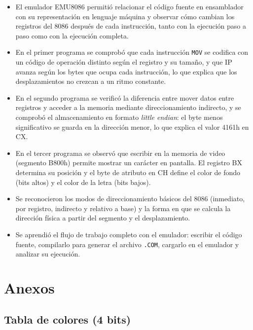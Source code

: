 \documentclass[10pt]{article}
\begin{document}
\begin{itemize}
  \item El emulador EMU8086 permitió relacionar el código fuente en ensamblador con su representación en lenguaje máquina y observar cómo cambian los registros del 8086 después de cada instrucción, tanto con la ejecución paso a paso como con la ejecución completa.
  \item En el primer programa se comprobó que cada instrucción \texttt{MOV} se codifica con un código de operación distinto según el registro y su tamaño, y que IP avanza según los bytes que ocupa cada instrucción, lo que explica que los desplazamientos no crezcan a un ritmo constante.
  \item En el segundo programa se verificó la diferencia entre mover datos entre registros y acceder a la memoria mediante direccionamiento indirecto, y se comprobó el almacenamiento en formato \textit{little endian}: el byte menos significativo se guarda en la dirección menor, lo que explica el valor 4161h en CX.
  \item En el tercer programa se observó que escribir en la memoria de video (segmento B800h) permite mostrar un carácter en pantalla. El registro BX determina su posición y el byte de atributo en CH define el color de fondo (bits altos) y el color de la letra (bits bajos).
  \item Se reconocieron los modos de direccionamiento básicos del 8086 (inmediato, por registro, indirecto y relativo a base) y la forma en que se calcula la dirección física a partir del segmento y el desplazamiento.
  \item Se aprendió el flujo de trabajo completo con el emulador: escribir el código fuente, compilarlo para generar el archivo \texttt{.COM}, cargarlo en el emulador y analizar su ejecución.
\end{itemize}

\clearpage
\appendix
\section{Anexos}
\subsection{Tabla de colores (4 bits)}
\end{document}
